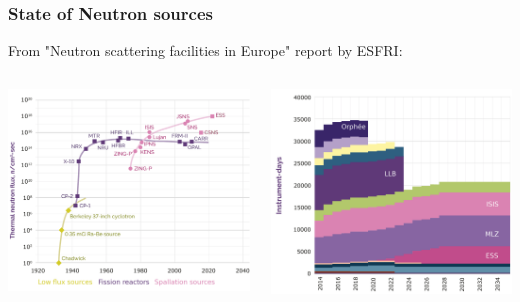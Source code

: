\begin{frame}
  \frametitle{State of Neutron sources}
  From "Neutron scattering facilities in Europe" report by ESFRI:
  \begin{columns}
    \begin{column}{0.50\textwidth}
      \includegraphics[width=\textwidth]{01_Neutron/fig/fig000_NeutronSources_a2}
    \end{column}
    \begin{column}{0.50\textwidth}
      \includegraphics[width=\textwidth]{01_Neutron/fig/fig000_NeutronSources_b2}

\end{column}
\end{columns}
\end{frame}
